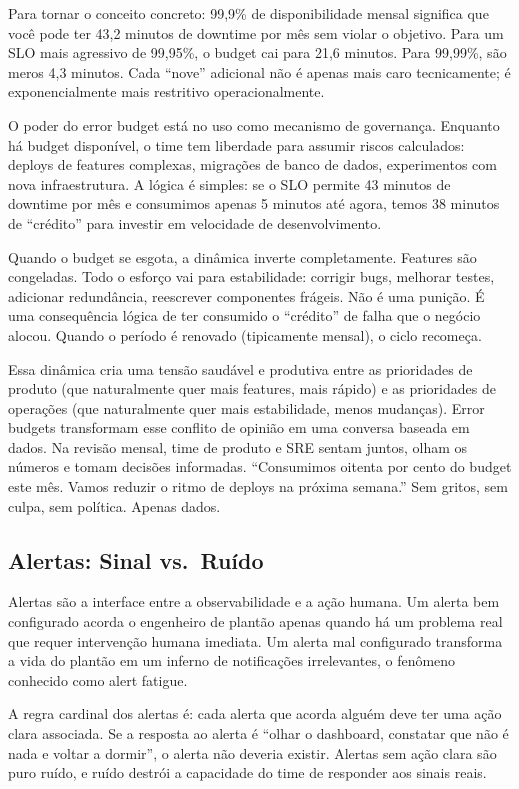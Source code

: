Para tornar o conceito concreto: 99,9\% de disponibilidade mensal significa que
você pode ter 43,2 minutos de downtime por mês sem violar o objetivo. Para um SLO
mais agressivo de 99,95\%, o budget cai para 21,6 minutos. Para 99,99\%, são
meros 4,3 minutos. Cada ``nove'' adicional não é apenas mais caro
tecnicamente; é exponencialmente mais restritivo operacionalmente.

O poder do error budget está no uso como mecanismo de governança. Enquanto
há budget disponível, o time tem liberdade para assumir riscos calculados:
deploys de features complexas, migrações de banco de dados, experimentos com
nova infraestrutura. A lógica é simples: se o SLO permite 43 minutos de downtime
por mês e consumimos apenas 5 minutos até agora, temos 38 minutos de ``crédito''
para investir em velocidade de desenvolvimento.

Quando o budget se esgota, a dinâmica inverte completamente. Features são
congeladas. Todo o esforço vai para estabilidade: corrigir bugs, melhorar
testes, adicionar redundância, reescrever componentes frágeis. Não é uma punição.
É uma consequência lógica de ter consumido o ``crédito'' de falha que o
negócio alocou. Quando o período é renovado (tipicamente mensal), o ciclo
recomeça.

Essa dinâmica cria uma tensão saudável e produtiva entre as prioridades de produto
(que naturalmente quer mais features, mais rápido) e as prioridades de operações
(que naturalmente quer mais estabilidade, menos mudanças). Error budgets
transformam esse conflito de opinião em uma conversa baseada em dados. Na
revisão mensal, time de produto e SRE sentam juntos, olham os números e tomam
decisões informadas. ``Consumimos oitenta por cento do budget este mês. Vamos
reduzir o ritmo de deploys na próxima semana.'' Sem gritos, sem culpa, sem
política. Apenas dados.

\subsection{Alertas: Sinal vs.\ Ruído}

Alertas são a interface entre a observabilidade e a ação humana. Um alerta bem
configurado acorda o engenheiro de plantão apenas quando há um problema real que
requer intervenção humana imediata. Um alerta mal configurado transforma a vida
do plantão em um inferno de notificações irrelevantes, o fenômeno conhecido
como alert fatigue.

A regra cardinal dos alertas é: cada alerta que acorda alguém deve ter uma ação
clara associada. Se a resposta ao alerta é ``olhar o dashboard, constatar que
não é nada e voltar a dormir'', o alerta não deveria existir. Alertas sem ação
clara são puro ruído, e ruído destrói a capacidade do time de responder aos sinais
reais.


